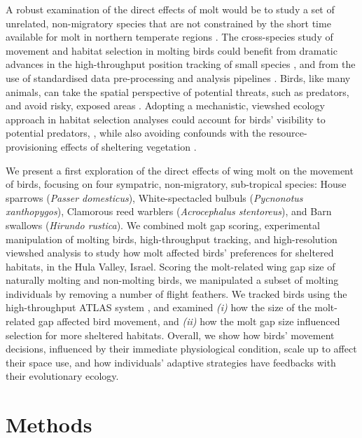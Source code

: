 \begin{refsection}
A robust examination of the direct effects of molt would be to study a set of unrelated, non-migratory species that are not constrained by the short time available for molt in northern temperate regions \cite{ginn1983,jenni2020}.
The cross-species study of movement and habitat selection in molting birds could benefit from dramatic advances in the high-throughput position tracking of small species \cite{toledo2020,nathan2022}, and from the use of standardised data pre-processing and analysis pipelines \cite{gupte2022d}.
Birds, like many animals, can take the spatial perspective of potential threats, such as predators, and avoid risky, exposed areas \cite{hampton1994,emery2000,krams2001,davidson2016}.
Adopting a mechanistic, viewshed ecology approach \cite{olsoy2015,aben2018,aben2021} in habitat selection analyses could account for birds' visibility to potential predators, \cite{olsoy2015,aben2018,aben2021}, while also avoiding confounds with the resource-provisioning effects of sheltering vegetation \citep{pettorelli2011}.

We present a first exploration of the direct effects of wing molt on the movement of birds, focusing on four sympatric, non-migratory, sub-tropical species: House sparrows (\textit{Passer domesticus}), White-spectacled bulbuls (\textit{Pycnonotus xanthopygos}), Clamorous reed warblers (\textit{Acrocephalus stentoreus}), and Barn swallows (\textit{Hirundo rustica}).
We combined molt gap scoring, experimental manipulation of molting birds, high-throughput tracking, and high-resolution viewshed analysis to study how molt affected birds' preferences for sheltered habitats, in the Hula Valley, Israel.
Scoring the molt-related wing gap size \citep{lind2001,kiat2016} of naturally molting and non-molting birds, we manipulated a subset of molting individuals by removing a number of flight feathers.
We tracked birds using the high-throughput ATLAS system \citep{toledo2014,weiser2016,toledo2020}, and examined \textit{(i)} how the size of the molt-related gap affected bird movement, and \textit{(ii)} how the molt gap size influenced selection for more sheltered habitats.
Overall, we show how birds' movement decisions, influenced by their immediate physiological condition, scale up to affect their space use, and how individuals' adaptive strategies have feedbacks with their evolutionary ecology.

\section*{Methods}


\end{refsection}
